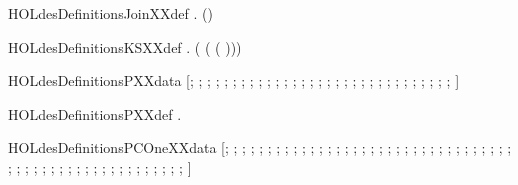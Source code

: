 \newcommand{\HOLdesDefinitionsISXXSBoxXXdef}{\UseVerbatim{HOLdesDefinitionsISXXSBoxXXdef}}
\begin{SaveVerbatim}{HOLdesDefinitionsJoinXXdef}
\HOLTokenTurnstile{} \HOLSymConst{\HOLTokenForall{}} .  (\HOLSymConst{,}) \HOLSymConst{=}   
\end{SaveVerbatim}
\newcommand{\HOLdesDefinitionsJoinXXdef}{\UseVerbatim{HOLdesDefinitionsJoinXXdef}}
\begin{SaveVerbatim}{HOLdesDefinitionsKSXXdef}
\HOLTokenTurnstile{} \HOLSymConst{\HOLTokenForall{}} .    \HOLSymConst{=}   ( ( (  )))
\end{SaveVerbatim}
\newcommand{\HOLdesDefinitionsKSXXdef}{\UseVerbatim{HOLdesDefinitionsKSXXdef}}
\begin{SaveVerbatim}{HOLdesDefinitionsPXXdata}
\HOLTokenTurnstile{}  \HOLSymConst{=}
   [; ; ; ; ; ; ; ; ; ; ; ; ; ; ; ;
    ; ; ; ; ; ; ; ; ; ; ; ; ; ; ; ]
\end{SaveVerbatim}
\newcommand{\HOLdesDefinitionsPXXdata}{\UseVerbatim{HOLdesDefinitionsPXXdata}}
\begin{SaveVerbatim}{HOLdesDefinitionsPXXdef}
\HOLTokenTurnstile{} \HOLSymConst{\HOLTokenForall{}}.   \HOLSymConst{=}   
\end{SaveVerbatim}
\newcommand{\HOLdesDefinitionsPXXdef}{\UseVerbatim{HOLdesDefinitionsPXXdef}}
\begin{SaveVerbatim}{HOLdesDefinitionsPCOneXXdata}
\HOLTokenTurnstile{}  \HOLSymConst{=}
   [; ; ; ; ; ; ; ; ; ; ; ; ; ; ; ;
    ; ; ; ; ; ; ; ; ; ; ; ; ; ; ;
    ; ; ; ; ; ; ; ; ; ; ; ; ; ; ;
    ; ; ; ; ; ; ; ; ; ]
\end{SaveVerbatim}
